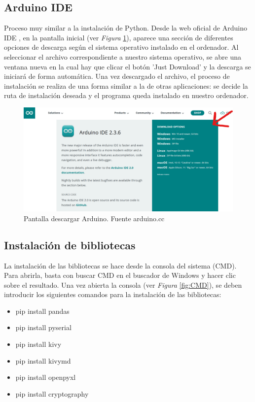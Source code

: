 \subsection{Arduino IDE}
Proceso muy similar a la instalación de Python. Desde la web oficial de Arduino IDE \cite{Arduino}, en la pantalla inicial (ver \textit{Figura} \ref{fig:Arduino}), aparece una sección de diferentes opciones de descarga según el sistema operativo instalado en el ordenador. Al seleccionar el archivo correspondiente a nuestro sistema operativo, se abre una ventana nueva en la cual hay que clicar el botón 'Just Download' y la descarga se iniciará de forma automática. Una vez descargado el archivo, el proceso de instalación se realiza de una forma similar a la de otras aplicaciones: se decide la ruta de instalación deseada y el programa queda instalado en nuestro ordenador.
    \begin{figure}[h]
        \centering
        \includegraphics[width=1\textwidth]{img/pantalla inicio arduino IDE.png}
        \caption{Pantalla descargar Arduino. Fuente arduino.cc}
        \label{fig:Arduino}
    \end{figure}
\subsection{Instalación de bibliotecas}
La instalación de las bibliotecas se hace desde la consola del sistema (CMD). Para abrirla, basta con buscar CMD en el buscador de Windows y hacer clic sobre el resultado.
Una vez abierta la consola (ver \textit{Figura} \ref{fig:CMD}), se deben introducir los siguientes comandos para la instalación de las bibliotecas:
\begin{itemize}
    \item pip install pandas
    \item pip install pyserial
    \item pip install kivy 
    \item pip install kivymd
    \item pip install openpyxl
    \item pip install cryptography
\end{itemize}


